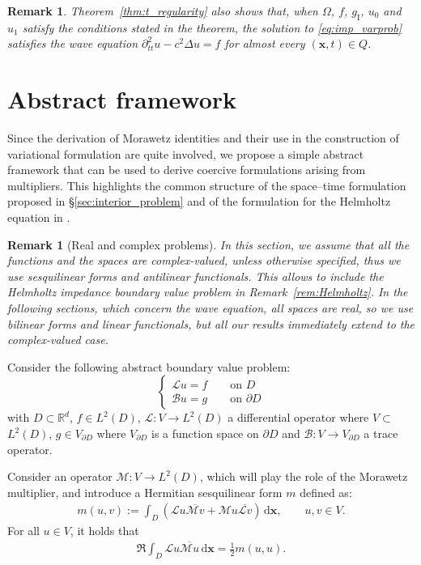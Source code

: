 \documentclass[a4paper]{article}
\theoremstyle{plain}
\newtheorem{remark}[theorem]{Remark}
\theoremstyle{definition}
\newcommand{\conj}[1]{\overline{#1}}
\newcommand{\operator}[1]{\mathcal{#1}}
\newcommand{\dx}{{\,\mathrm{d}\vect x}}
\newcommand{\SecondTimeDer}{{\partial^2_{tt}}}
\newcommand{\vect}[1]{\bm{#1}}
\newcommand{\R}{\mathbb{R}}
\newcommand{\gI}{{g_{\mathrm I}}}
\begin{document}
\begin{remark}
Theorem~\ref{thm:t_regularity} also shows that, when $\Omega$, $f$, $\gI$, $u_0$ and $u_1$ satisfy the conditions stated in the theorem,
the solution to \eqref{eq:imp_varprob} satisfies the wave equation $\SecondTimeDer u-c^2\Delta u=f$ for almost every $(\vect x, t) \in Q$.
\end{remark}



\section{Abstract framework}
\label{sec:abstract_framework}

Since the derivation of Morawetz identities and their use in the construction of variational formulation are quite involved, we propose a simple abstract framework that can be used to derive coercive formulations arising from multipliers.
This highlights the common structure of the space--time formulation proposed in \S\ref{sec:interior_problem} and of the formulation for the Helmholtz equation in \cite{Moiola2014}.

\begin{remark}[Real and complex problems]\label{rem:ComplexReal}
	In this section, we assume that all the functions and the spaces are complex-valued, unless otherwise specified, thus we use sesquilinear forms and antilinear functionals.
	This allows to include the Helmholtz impedance boundary value problem in Remark~\ref{rem:Helmholtz}.
	In the following sections, which concern the wave equation, all spaces are real, so we use bilinear forms and linear functionals, but all our results immediately extend to the complex-valued case.
\end{remark}

Consider the following abstract boundary value problem:
\begin{equation}
	\label{eq:abstract_problem}
	\begin{cases}
		\operator{L} u = f \qquad \text{on } {D} \\
		\operator{B} u = g \qquad \text{on } \partial {D}
	\end{cases}
\end{equation}
with $D \subset \R^d$,
$f\in L^2(D)$,
$\operator L:V\to L^2(D)$ a differential operator where $V\subset$ $L^2(D)$,
$g\in V_{\partial D}$ where $V_{\partial D}$ is a function space on $\partial D$ and
$\operator{B}:V\to V_{\partial D}$ a trace operator.

Consider an operator $\operator{M}:V\to L^2(D)$, which will play the role of the Morawetz multiplier, and introduce a Hermitian sesquilinear form $m$  defined as:
\begin{align}\label{eq:m_def}
	m(u,v) :=\int_D (\operator{L}u \conj{\operator{M}v} + \operator{M}u\conj{\operator{L}v})\dx,
	\qquad u,v\in V.
\end{align}
For all $u\in V$, it holds that
\begin{align}\label{eq:real_part}
	\Re \int_D \operator{L}u\conj{\operator{M}u} \dx = \frac{1}{2} m(u,u).
\end{align}
\end{document}
